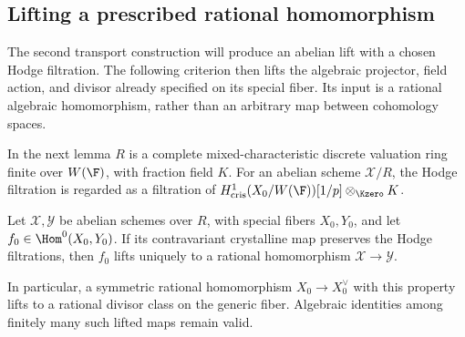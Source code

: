 \subsection{Lifting a prescribed rational homomorphism}

The second transport construction will produce an abelian lift with a
chosen Hodge filtration. The following criterion then lifts the algebraic
projector, field action, and divisor already specified on its special fiber.
Its input is a rational algebraic homomorphism, rather than an arbitrary
map between cohomology spaces.

In the next lemma \(R\) is a complete mixed-characteristic discrete
valuation ring finite over \(W(\F)\), with fraction field \(K\).
For an abelian scheme \(\mathcal X/R\), the Hodge filtration is regarded
as a filtration of
\(H^1_{\mathrm{cris}}(X_0/W(\F))[1/p]\otimes_{\Kzero}K\).

\begin{lemma}\label{lem:lift-hom}
Let \(\mathcal X,\mathcal Y\) be abelian schemes over \(R\), with
special fibers \(X_0,Y_0\), and let
\(f_0\in\Hom^0(X_0,Y_0)\). If its contravariant crystalline map
preserves the Hodge filtrations, then \(f_0\) lifts uniquely to a
rational homomorphism \(\mathcal X\to\mathcal Y\).

In particular, a symmetric rational homomorphism \(X_0\to X_0^\vee\)
with this property lifts to a rational divisor class on the generic
fiber. Algebraic identities among finitely many such lifted maps remain
valid.
\end{lemma}

